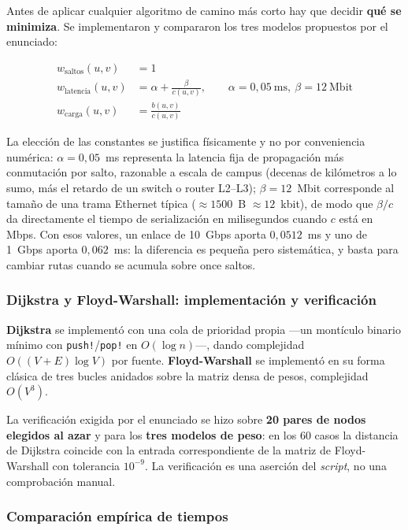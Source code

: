 \documentclass[10pt,a4paper]{extarticle}
\newcommand{\code}[1]{\texttt{\small #1}}
\begin{document}
Antes de aplicar cualquier algoritmo de camino más corto hay que decidir \textbf{qué se
minimiza}. Se implementaron y compararon los tres modelos propuestos por el enunciado:

\begin{align}
w_{\text{saltos}}(u,v)   &= 1 \\
w_{\text{latencia}}(u,v) &= \alpha + \frac{\beta}{c(u,v)}, \qquad \alpha = 0{,}05\ \text{ms},\ \beta = 12\ \text{Mbit} \\
w_{\text{carga}}(u,v)    &= \frac{b(u,v)}{c(u,v)}
\end{align}

La elección de las constantes se justifica físicamente y no por conveniencia numérica:
$\alpha = 0{,}05$~ms representa la latencia fija de propagación más conmutación por salto,
razonable a escala de campus (decenas de kilómetros a lo sumo, más el retardo de un switch o
router L2--L3); $\beta = 12$~Mbit corresponde al tamaño de una trama Ethernet típica
($\approx 1500$~B $\approx 12$~kbit), de modo que $\beta/c$ da directamente el tiempo de
serialización en milisegundos cuando $c$ está en Mbps. Con esos valores, un enlace de
10~Gbps aporta $0{,}0512$~ms y uno de 1~Gbps aporta $0{,}062$~ms: la diferencia es pequeña
pero sistemática, y basta para cambiar rutas cuando se acumula sobre once saltos.

\subsubsection{Dijkstra y Floyd-Warshall: implementación y verificación}

\textbf{Dijkstra} se implementó con una cola de prioridad propia ---un montículo binario
mínimo con \code{push!}/\code{pop!} en $O(\log n)$---, dando complejidad
$O((V+E)\log V)$ por fuente. \textbf{Floyd-Warshall} se implementó en su forma clásica de
tres bucles anidados sobre la matriz densa de pesos, complejidad $O(V^3)$.

La verificación exigida por el enunciado se hizo sobre \textbf{20 pares de nodos elegidos al
azar} y para los \textbf{tres modelos de peso}: en los 60 casos la distancia de Dijkstra
coincide con la entrada correspondiente de la matriz de Floyd-Warshall con tolerancia
$10^{-9}$. La verificación es una aserción del \textit{script}, no una comprobación manual.

\subsubsection{Comparación empírica de tiempos}
\end{document}
